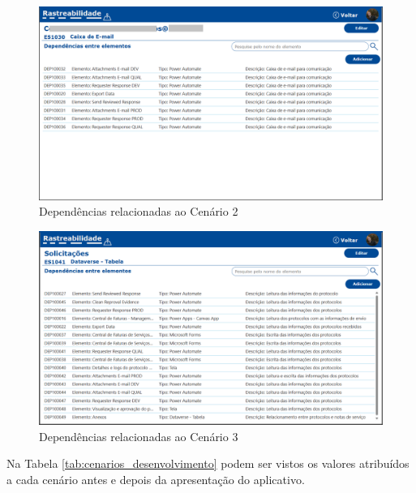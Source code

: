 	\begin{figure}[!h]
		\centering
		\includegraphics[width=1\textwidth]{./figuras/caixadeEmail.png}
		\caption{Dependências relacionadas ao Cenário 2}
		\label{fig:resultados:caixadeEmail}
	\end{figure}

	\begin{figure}[!h]
		\centering
		\includegraphics[width=1\textwidth]{./figuras/solicitacoesTabela.png}
		\caption{Dependências relacionadas ao Cenário 3}
		\label{fig:resultados:solicitacoesTabela}
	\end{figure}

	Na Tabela \ref{tab:cenarios_desenvolvimento} podem ser vistos os valores atribuídos a cada cenário antes e depois da apresentação do aplicativo.

